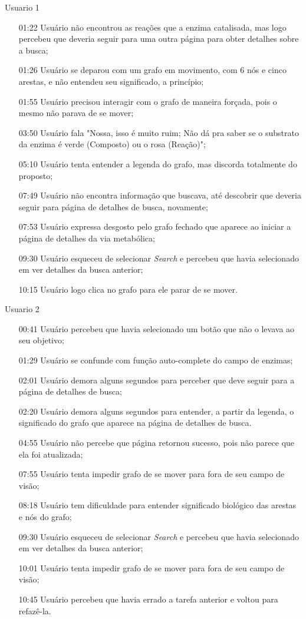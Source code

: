Usuario 1
\begin{itemize}
\item[01:22] Usuário não encontrou as reações que a enzima catalisada, mas logo percebeu que deveria seguir para uma outra página para obter detalhes sobre a busca;
\item[01:26] Usuário se deparou com um grafo em movimento, com 6 nós e cinco arestas, e não entendeu seu significado, a princípio;
\item[01:55] Usuário precisou interagir com o grafo de maneira forçada, pois o mesmo não parava de se mover;
\item[03:50] Usuário fala "Nossa, isso é muito ruim; Não dá pra saber se o substrato da enzima é verde (Composto) ou o rosa (Reação)";
\item[05:10] Usuário tenta entender a legenda do grafo, mas discorda totalmente do proposto;
\item[07:49] Usuário não encontra informação que buscava, até descobrir que deveria seguir para página de detalhes de busca, novamente;
\item[07:53] Usuário expressa desgosto pelo grafo fechado que aparece ao iniciar a página de detalhes da via metabólica;
\item[09:30] Usuário esqueceu de selecionar \textit{Search} e percebeu que havia selecionado em ver detalhes da busca anterior;
\item[10:15] Usuário logo clica no grafo para ele parar de se mover.
\end{itemize}


Usuario 2
\begin{itemize}
\item[00:41] Usuário percebeu que havia selecionado um botão que não o levava ao seu objetivo;
\item[01:29] Usuário se confunde com função auto-complete do campo de enzimas;
\item[02:01] Usuário demora alguns segundos para perceber que deve seguir para a página de detalhes de busca;
\item[02:20] Usuário demora alguns segundos para entender, a partir da legenda, o significado do grafo que aparece na página de detalhes de busca.
\item[04:55] Usuário não percebe que página retornou sucesso, pois não parece que ela foi atualizada;
\item[07:55] Usuário tenta impedir grafo de se mover para fora de seu campo de visão;
\item[08:18] Usuário tem dificuldade para entender significado biológico das arestas e nós do grafo;
\item[09:30] Usuário esqueceu de selecionar \textit{Search} e percebeu que havia selecionado em ver detalhes da busca anterior;
\item[10:01] Usuário tenta impedir grafo de se mover para fora de seu campo de visão;
\item[10:45] Usuário percebeu que havia errado a tarefa anterior e voltou para refazê-la.
\end{itemize}

